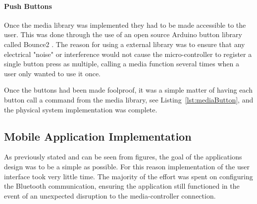 \documentclass{article}
\begin{document}
			\paragraph{Push Buttons}
			Once the media library was implemented they had to be made accessible to the user. This was done through the use of an open source Arduino button library called Bounce2 \cite{Bounce2Git:online}. The reason for using a external library was to ensure that any electrical "noise" or interference would not cause the micro-controller to register a single button press as multiple, calling a media function several times when a user only wanted to use it once.
			
			Once the buttons had been made foolproof, it was a simple matter of having each button call a command from the media library, see Listing~\ref{lst:mediaButton}, and the physical system implementation was complete. 
			
			
									
		\subsection{Mobile Application Implementation}
			As previously stated and can be seen from figures, the goal of the applications design was to be a simple as possible. For this reason implementation of the user interface took very little time. The majority of the effort was spent on configuring the Bluetooth communication, ensuring the application still functioned in the event of an unexpected disruption to the media-controller connection.
			
\end{document}
